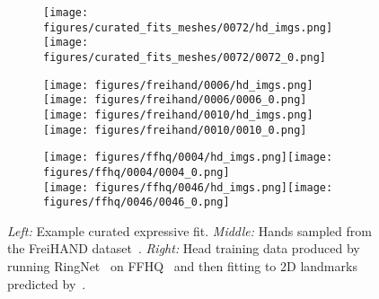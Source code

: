 \documentclass[runningheads]{llncs}
\newcommand{\freihand}{\mbox{FreiHAND}\xspace}
\newcommand{\ringnet}{\mbox{RingNet}\xspace}
\newcommand{\twoD}{2D\xspace}
\newcommand{\labelLEFT}{\mbox{\emph{Left:}}\xspace}
\newcommand{\labelMIDDLE}{\mbox{\emph{Middle:}}\xspace}
\newcommand{\labelRIGHT}{\mbox{\emph{Right:}}\xspace}
\begin{document}
\newcommand{\trainDataSizL}{0.80}
\newcommand{\trainDataSizR}{0.40}
\begin{figure}[t]
    \centering
    \begin{subfigure}[!h]{0.32\textwidth}
        \centering
        \texttt{[image: figures/curated\_fits\_meshes/0072/hd\_imgs.png]}\texttt{[image: figures/curated\_fits\_meshes/0072/0072\_0.png]}
    \end{subfigure}
    \begin{subfigure}{0.32\textwidth}
        \centering
        \texttt{[image: figures/freihand/0006/hd\_imgs.png]}\texttt{[image: figures/freihand/0006/0006\_0.png]}\\
        \texttt{[image: figures/freihand/0010/hd\_imgs.png]}\texttt{[image: figures/freihand/0010/0010\_0.png]}
    \end{subfigure}
    \begin{subfigure}{0.32\textwidth}
        \centering
        \texttt{[image: figures/ffhq/0004/hd\_imgs.png]}\texttt{[image: figures/ffhq/0004/0004\_0.png]}\\
        \texttt{[image: figures/ffhq/0046/hd\_imgs.png]}\texttt{[image: figures/ffhq/0046/0046\_0.png]}
    \end{subfigure}
    \caption{
        \labelLEFT Example  curated expressive fit.
        \labelMIDDLE Hands sampled from the \freihand dataset~\cite{Freihand2019}.
        \labelRIGHT Head training data produced by running \ringnet~\cite{sanyal_2019_cvpr}
        on FFHQ~\cite{karras2019style} and then fitting to \twoD landmarks predicted by~\cite{bulat2017far}.
    }
    \label{fig:training_samples}\end{figure}
 
\end{document}
